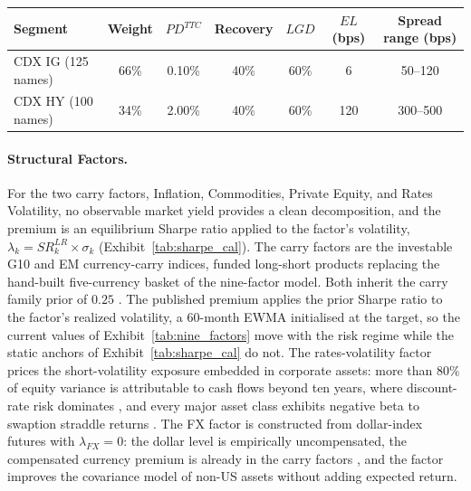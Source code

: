 \documentclass[pdftex,12pt,a4paper]{article}
\begin{document}
\begin{table}[H]
	\label{tab:actuarial}\vspace*{-1.0\baselineskip}
	\begin{center}
		\small
		\begin{tabular}{lcccccc}
			\toprule
			\textbf{Segment} & \textbf{Weight} & $PD^{TTC}$ & \textbf{Recovery} & $LGD$ & $EL$ (bps) & \textbf{Spread range (bps)} \\
			\midrule
			CDX IG (125 names) & 66\% & 0.10\% & 40\% & 60\% & 6 & 50--120 \\
			CDX HY (100 names) & 34\% & 2.00\% & 40\% & 60\% & 120 & 300--500 \\
			\bottomrule
		\end{tabular}\vspace*{-1.0\baselineskip}
	\end{center}
\end{table}

\paragraph*{Structural Factors.} For the two carry factors, Inflation, Commodities, Private Equity, and Rates Volatility, no observable market yield provides a clean decomposition, and the premium is an equilibrium Sharpe ratio applied to the factor's volatility, $\lambda_k = SR_k^{LR} \times \sigma_k$ (Exhibit~\ref{tab:sharpe_cal}).
The carry factors are the investable G10 and EM currency-carry indices, funded long-short products replacing the hand-built five-currency basket of the nine-factor model. Both inherit the carry family prior of $0.25$ \citep{LustigRV2011}.
The published premium applies the prior Sharpe ratio to the factor's realized volatility, a 60-month EWMA initialised at the target, so the current values of Exhibit~\ref{tab:nine_factors} move with the risk regime while the static anchors of Exhibit~\ref{tab:sharpe_cal} do not. The rates-volatility factor prices the short-volatility exposure embedded in corporate assets: more than $80\%$ of equity variance is attributable to cash flows beyond ten years, where discount-rate risk dominates \citep{Goncalves2025}, and every major asset class exhibits negative beta to swaption straddle returns \citep{Morris2026}. The FX factor is constructed from dollar-index futures with $\lambda_{FX} = 0$: the dollar level is empirically uncompensated, the compensated currency premium is already in the carry factors \citep{LustigRV2011}, and the factor improves the covariance model of non-US assets without adding expected return.
\end{document}
